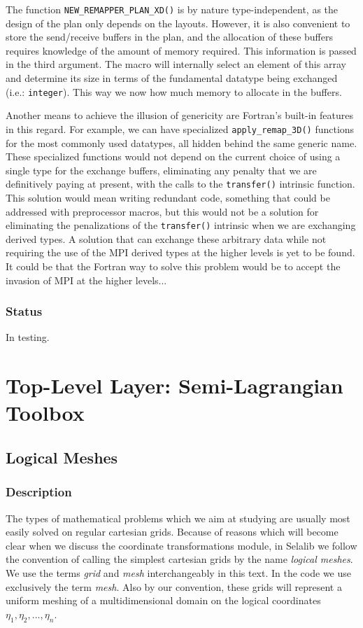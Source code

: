 \documentclass[]{report}   %
\begin{document}
The function \verb+NEW_REMAPPER_PLAN_XD()+ is by nature type-independent, as the design of the plan only depends on the layouts. However, it is also convenient to store the send/receive buffers in the plan, and the allocation of these buffers requires knowledge of the amount of memory required. This information is passed in the third argument. The macro will internally select an element of this array and determine its size in terms of the fundamental datatype being exchanged (i.e.: \verb+integer+). This way we now how much memory to allocate in the buffers.

Another means to achieve the illusion of genericity are Fortran's built-in features in this regard. For example, we can have specialized \verb+apply_remap_3D()+ functions for the most commonly used datatypes, all hidden behind the same generic name. These specialized functions would not depend on the current choice of using a single type for the exchange buffers, eliminating any penalty that we are definitively paying at present, with the calls to the \verb+transfer()+ intrinsic function. This solution would mean writing redundant code, something that could be addressed with preprocessor macros, but this would not be a solution for eliminating the penalizations of the \verb+transfer()+ intrinsic when we are exchanging derived types. A solution that can exchange these arbitrary data while not requiring the use of the MPI derived types at the higher levels is yet to be found. It could be that the Fortran way to solve this problem would be to accept the invasion of MPI at the higher levels...

\subsection{Status}

In testing.

\chapter{Top-Level Layer: Semi-Lagrangian Toolbox}




\section{Logical Meshes}

   \subsection{Description}
   The types of mathematical problems which we aim at studying are usually most easily solved on regular cartesian grids. Because of reasons which will become clear when we discuss the coordinate transformations module, in Selalib we follow the convention of calling the simplest cartesian grids by the name \emph{logical meshes}. We use the terms \emph{grid} and \emph{mesh} interchangeably in this text. In the code we use exclusively the term \emph{mesh}. Also by our convention, these grids will represent a uniform meshing of a multidimensional domain on the logical coordinates $\eta_1, \eta_2, ..., \eta_n$. 
   
\end{document}
